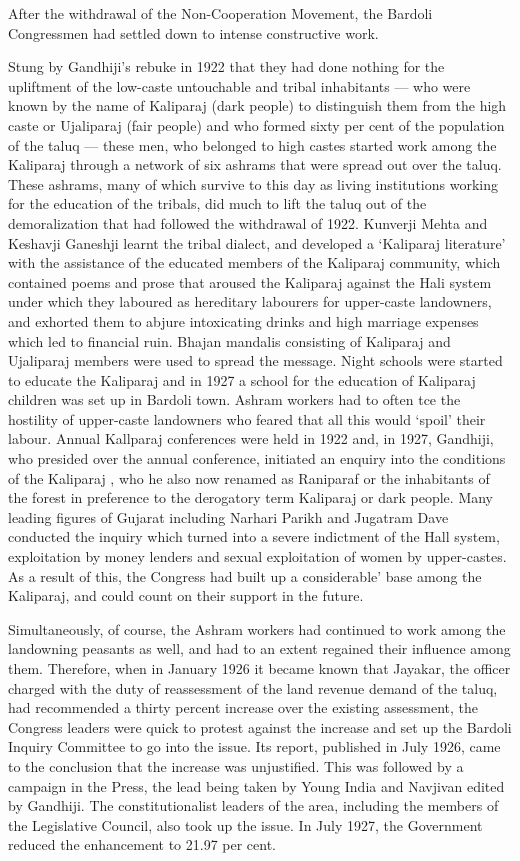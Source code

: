 After the withdrawal of the Non-Cooperation Movement, the Bardoli Congressmen had settled down to intense constructive work.

Stung by Gandhiji's rebuke in 1922 that they had done nothing for the upliftment of the low-caste untouchable and tribal inhabitants --- who were known by the name of Kaliparaj (dark people) to distinguish them from the high caste or Ujaliparaj (fair people) and who formed sixty per cent of the population of the taluq --- these men, who belonged to high castes started work among the Kaliparaj through a network of six ashrams that were spread out over the taluq. These ashrams, many of which survive to this day as living institutions working for the education of the tribals, did much to lift the taluq out of the demoralization that had followed the withdrawal of 1922. Kunverji Mehta and Keshavji Ganeshji learnt the tribal dialect, and developed a `Kaliparaj literature' with the assistance of the educated members of the Kaliparaj community, which contained poems and prose that aroused the Kaliparaj against the Hali system under which they laboured as hereditary labourers for upper-caste landowners, and exhorted them to abjure intoxicating drinks and high marriage expenses which led to financial ruin. Bhajan mandalis consisting of Kaliparaj and Ujaliparaj members were used to spread the message. Night schools were started to educate the Kaliparaj and in 1927 a school for the education of Kaliparaj children was set up in Bardoli town. Ashram workers had to often tce the hostility of upper-caste landowners who feared that all this would `spoil' their labour. Annual Kallparaj conferences were held in 1922 and, in 1927, Gandhiji, who presided over the annual conference, initiated an enquiry into the conditions of the Kaliparaj , who he also now renamed as Raniparaf or the inhabitants of the forest in preference to the derogatory term Kaliparaj or dark people. Many leading figures of Gujarat including Narhari Parikh and Jugatram Dave conducted the inquiry which turned into a severe indictment of the Hall system, exploitation by money lenders and sexual exploitation of women by upper-castes. As a result of this, the Congress had built up a considerable' base among the Kaliparaj, and could count on their support in the future.

Simultaneously, of course, the Ashram workers had continued to work among the landowning peasants as well, and had to an extent regained their influence among them. Therefore, when in January 1926 it became known that Jayakar, the officer charged with the duty of reassessment of the land revenue demand of the taluq, had recommended a thirty percent increase over the existing assessment, the Congress leaders were quick to protest against the increase and set up the Bardoli Inquiry Committee to go into the issue. Its report, published in July 1926, came to the conclusion that the increase was unjustified. This was followed by a campaign in the Press, the lead being taken by Young India and Navjivan edited by Gandhiji. The constitutionalist leaders of the area, including the members of the Legislative Council, also took up the issue. In July 1927, the Government reduced the enhancement to 21.97 per cent.

